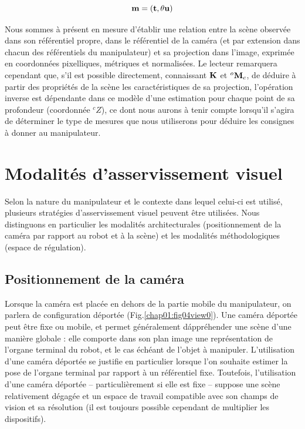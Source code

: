 \begin{equation}
{\bf m} = ({\bf t}, \theta {\bf u})  
\label{chap01:eq10}
\end{equation}

Nous sommes \`a pr\'esent en mesure d'établir une relation entre la scène observée 
dans son référentiel propre, dans le r\'ef\'erentiel de la cam\'era (et par extension dans chacun des r\'ef\'erentiels du manipulateur) et sa projection dans l'image, exprimée en coordonnées pixelliques, métriques et normalisées. Le lecteur 
remarquera cependant que, s'il est possible directement, connaissant ${\bf K}$ 
et ${}^o{\bf M}_c$, de déduire à partir des propriétés de la scène les 
caractéristiques de sa projection, l'opération inverse est dépendante dans ce 
modèle d'une estimation pour chaque point de sa profondeur (coordonnée ${}^cZ$), ce dont nous aurons \`a tenir compte lorsqu'il s'agira de d\'eterminer le type de mesures que nous utiliserons pour d\'eduire les consignes \`a donner au manipulateur.

\section{Modalit\'es d'asservissement visuel} 
\label{chap1-1}

Selon la nature du manipulateur et le contexte dans lequel celui-ci est utilis\'e, plusieurs strat\'egies d'asservissement visuel peuvent \^etre utilis\'ees. Nous distinguons en particulier les modalit\'es architecturales (positionnement de la cam\'era par rapport au robot et \`a la sc\`ene) et les modalit\'es m\'ethodologiques (espace de r\'egulation).

\subsection{Positionnement de la caméra} \label{chap1-1-0}

Lorsque la cam\'era est plac\'ee en dehors de la partie mobile du manipulateur, on parlera de configuration déportée 
(Fig.\ref{chap01:fig04view0}). Une cam\'era d\'eport\'ee peut \^etre fixe ou mobile, et permet g\'en\'eralement d\'appr\'ehender une sc\`ene d'une mani\`ere globale : elle comporte dans son plan image une repr\'esentation de l'organe terminal du robot, et le cas \'ech\'eant de l'objet \`a manipuler. L'utilisation d'une cam\'era d\'eport\'ee se justifie en particulier lorsque l'on souhaite estimer la pose de l'organe terminal par rapport \`a un r\'ef\'erentiel fixe. Toutefois, l'utilisation d'une cam\'era d\'eport\'ee -- particuli\`erement si elle est fixe -- suppose une sc\`ene relativement d\'egag\'ee et un espace de travail compatible avec son champs de vision et sa r\'esolution (il est toujours possible cependant de multiplier les dispositifs).

